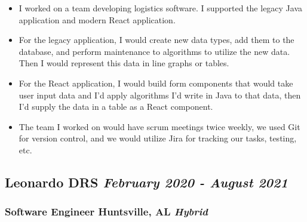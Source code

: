 \documentclass{article}
\begin{document}
\begin{itemize}
    \item I worked on a team developing logistics software. I supported
     the legacy Java application and modern React application.
    \item For the legacy application, I would create new data types, add 
    them to the database, and perform maintenance to algorithms to utilize 
    the new data. Then I would represent this data in line graphs or tables.
    \item For the React application, I would build form components that
    would take user input data and I'd apply algorithms I'd write in Java 
    to that data, then I'd supply the data in a table as a React  component.
    \item The team I worked on would have scrum meetings twice weekly, we used
    Git for version control, and we would utilize Jira for tracking our tasks, 
    testing, etc.
\end{itemize}

\subsection*{\hspace*{0.15cm} Leonardo DRS \hfill \textit{February 2020 - August 2021}}

\subsubsection*{\hspace*{0.15cm} Software Engineer \hfill Huntsville, AL \textit{Hybrid}}
\end{document}
